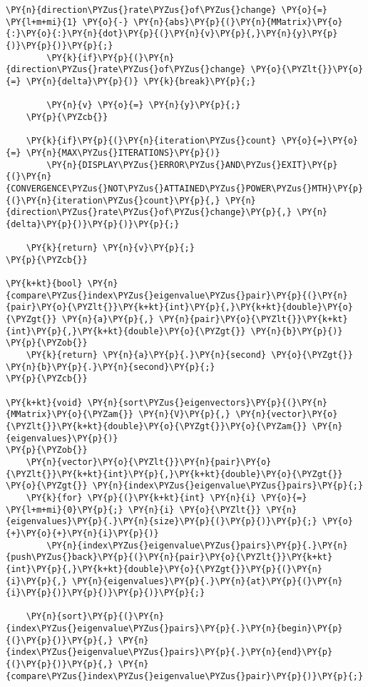 \begin{Verbatim}[commandchars=\\\{\}]
		\PY{n}{direction\PYZus{}rate\PYZus{}of\PYZus{}change} \PY{o}{=} \PY{l+m+mi}{1} \PY{o}{-} \PY{n}{abs}\PY{p}{(}\PY{n}{MMatrix}\PY{o}{:}\PY{o}{:}\PY{n}{dot}\PY{p}{(}\PY{n}{v}\PY{p}{,}\PY{n}{y}\PY{p}{)}\PY{p}{)}\PY{p}{;}
		\PY{k}{if}\PY{p}{(}\PY{n}{direction\PYZus{}rate\PYZus{}of\PYZus{}change} \PY{o}{\PYZlt{}}\PY{o}{=} \PY{n}{delta}\PY{p}{)} \PY{k}{break}\PY{p}{;}

		\PY{n}{v} \PY{o}{=} \PY{n}{y}\PY{p}{;}
	\PY{p}{\PYZcb{}}

	\PY{k}{if}\PY{p}{(}\PY{n}{iteration\PYZus{}count} \PY{o}{=}\PY{o}{=} \PY{n}{MAX\PYZus{}ITERATIONS}\PY{p}{)}
		\PY{n}{DISPLAY\PYZus{}ERROR\PYZus{}AND\PYZus{}EXIT}\PY{p}{(}\PY{n}{CONVERGENCE\PYZus{}NOT\PYZus{}ATTAINED\PYZus{}POWER\PYZus{}MTH}\PY{p}{(}\PY{n}{iteration\PYZus{}count}\PY{p}{,} \PY{n}{direction\PYZus{}rate\PYZus{}of\PYZus{}change}\PY{p}{,} \PY{n}{delta}\PY{p}{)}\PY{p}{)}\PY{p}{;}

	\PY{k}{return} \PY{n}{v}\PY{p}{;}
\PY{p}{\PYZcb{}}

\PY{k+kt}{bool} \PY{n}{compare\PYZus{}index\PYZus{}eigenvalue\PYZus{}pair}\PY{p}{(}\PY{n}{pair}\PY{o}{\PYZlt{}}\PY{k+kt}{int}\PY{p}{,}\PY{k+kt}{double}\PY{o}{\PYZgt{}} \PY{n}{a}\PY{p}{,} \PY{n}{pair}\PY{o}{\PYZlt{}}\PY{k+kt}{int}\PY{p}{,}\PY{k+kt}{double}\PY{o}{\PYZgt{}} \PY{n}{b}\PY{p}{)}
\PY{p}{\PYZob{}}
	\PY{k}{return} \PY{n}{a}\PY{p}{.}\PY{n}{second} \PY{o}{\PYZgt{}} \PY{n}{b}\PY{p}{.}\PY{n}{second}\PY{p}{;}
\PY{p}{\PYZcb{}}

\PY{k+kt}{void} \PY{n}{sort\PYZus{}eigenvectors}\PY{p}{(}\PY{n}{MMatrix}\PY{o}{\PYZam{}} \PY{n}{V}\PY{p}{,} \PY{n}{vector}\PY{o}{\PYZlt{}}\PY{k+kt}{double}\PY{o}{\PYZgt{}}\PY{o}{\PYZam{}} \PY{n}{eigenvalues}\PY{p}{)}
\PY{p}{\PYZob{}}
	\PY{n}{vector}\PY{o}{\PYZlt{}}\PY{n}{pair}\PY{o}{\PYZlt{}}\PY{k+kt}{int}\PY{p}{,}\PY{k+kt}{double}\PY{o}{\PYZgt{}} \PY{o}{\PYZgt{}} \PY{n}{index\PYZus{}eigenvalue\PYZus{}pairs}\PY{p}{;}
	\PY{k}{for} \PY{p}{(}\PY{k+kt}{int} \PY{n}{i} \PY{o}{=} \PY{l+m+mi}{0}\PY{p}{;} \PY{n}{i} \PY{o}{\PYZlt{}} \PY{n}{eigenvalues}\PY{p}{.}\PY{n}{size}\PY{p}{(}\PY{p}{)}\PY{p}{;} \PY{o}{+}\PY{o}{+}\PY{n}{i}\PY{p}{)}
		\PY{n}{index\PYZus{}eigenvalue\PYZus{}pairs}\PY{p}{.}\PY{n}{push\PYZus{}back}\PY{p}{(}\PY{n}{pair}\PY{o}{\PYZlt{}}\PY{k+kt}{int}\PY{p}{,}\PY{k+kt}{double}\PY{o}{\PYZgt{}}\PY{p}{(}\PY{n}{i}\PY{p}{,} \PY{n}{eigenvalues}\PY{p}{.}\PY{n}{at}\PY{p}{(}\PY{n}{i}\PY{p}{)}\PY{p}{)}\PY{p}{)}\PY{p}{;}

	\PY{n}{sort}\PY{p}{(}\PY{n}{index\PYZus{}eigenvalue\PYZus{}pairs}\PY{p}{.}\PY{n}{begin}\PY{p}{(}\PY{p}{)}\PY{p}{,} \PY{n}{index\PYZus{}eigenvalue\PYZus{}pairs}\PY{p}{.}\PY{n}{end}\PY{p}{(}\PY{p}{)}\PY{p}{,} \PY{n}{compare\PYZus{}index\PYZus{}eigenvalue\PYZus{}pair}\PY{p}{)}\PY{p}{;}


\end{Verbatim}
